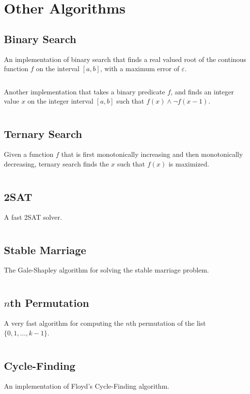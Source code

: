 \documentclass[9pt,a4paper]{amsart}
\newcommand{\code}[1]{\inputminted[linenos]{cpp}{_code/#1}}
\begin{document}
\section{Other Algorithms}
    \subsection{Binary Search}
        An implementation of binary search that finds a real valued root of the
        continous function $f$ on the interval $[a,b]$, with a maximum error of
        $\varepsilon$.
        \code{other/binary_search_continuous.cpp}

        Another implementation that takes a binary predicate $f$, and finds an
        integer value $x$ on the integer interval $[a,b]$ such that $f(x) \land
        \lnot f(x - 1)$.
        \code{other/binary_search_discrete.cpp}

    \subsection{Ternary Search}
        Given a function $f$ that is first monotonically increasing and then
        monotonically decreasing, ternary search finds the $x$ such that $f(x)$ is
        maximized.
        \code{other/ternary_search_continuous.cpp}

    \subsection{2SAT}
        A fast 2SAT solver.
        \code{other/two_sat.cpp}

    \subsection{Stable Marriage}
        The Gale-Shapley algorithm for solving the stable marriage problem.
        \code{other/stable_marriage.cpp}

    \subsection{$n$th Permutation}
        A very fast algorithm for computing the $n$th permutation of the list
        $\{0,1,\ldots,k-1\}$.
        \code{other/nth_permutation.cpp}

    \subsection{Cycle-Finding}
        An implementation of Floyd's Cycle-Finding algorithm.
        \code{other/floyds_algorithm.cpp}
\end{document}

